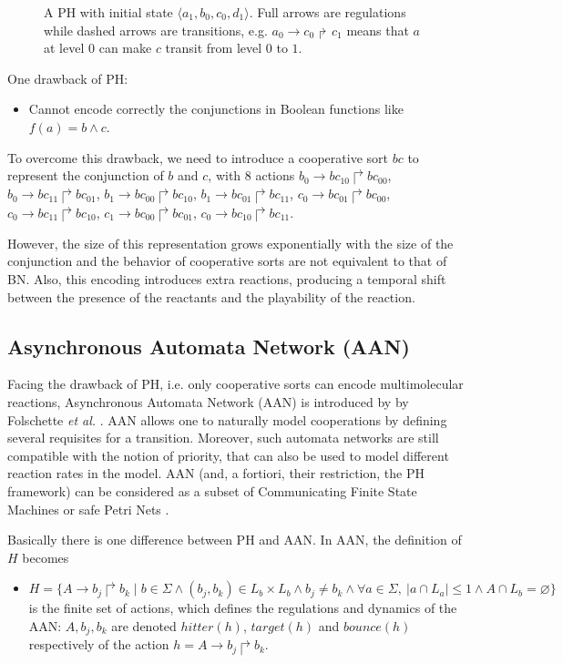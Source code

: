 \begin{figure}[ht]
\centering

\caption[Process Hitting]{A PH with initial state $\langle a_1,b_0,c_0,d_1\rangle$.
Full arrows are regulations while dashed arrows are transitions, e.g. $a_0\to c_0\Rsh c_1$  means that $a$ at level $0$ can make $c$ transit from level $0$ to $1$.}\label{fig:PH}
\end{figure}

One drawback of PH: 

\begin{itemize}
    \item Cannot encode correctly the conjunctions in Boolean functions like $f(a)=b\land c$.
\end{itemize}

To overcome this drawback, we need to introduce a cooperative sort $bc$ to represent the conjunction of $b$ and $c$, with 8 actions $b_0\to bc_{10}\Rsh bc_{00}$, $b_0\to bc_{11}\Rsh bc_{01}$, $b_1\to bc_{00}\Rsh bc_{10}$, $b_1\to bc_{01}\Rsh bc_{11}$, $c_0\to bc_{01}\Rsh bc_{00}$, $c_0\to bc_{11}\Rsh bc_{10}$, $c_1\to bc_{00}\Rsh bc_{01}$, $c_0\to bc_{10}\Rsh bc_{11}$.

However, the size of this representation grows exponentially with the size of the conjunction and the behavior of cooperative sorts are not equivalent to that of BN. 
Also, this encoding introduces extra reactions, producing a temporal shift between the presence of the reactants and the playability of the reaction.

\subsection{Asynchronous Automata Network (AAN)}
Facing the drawback of PH, i.e. only cooperative sorts can encode multimolecular reactions, Asynchronous Automata Network (AAN) is introduced by by Folschette \textit{et al.} \cite{folschette2015}.
AAN allows one to naturally model cooperations by defining several requisites for a transition.
Moreover, such automata networks are still compatible with the notion of priority, that can also be used to model different reaction rates in the model.
AAN (and, a fortiori, their restriction, the PH framework) can be considered as a subset of Communicating Finite State Machines or safe Petri Nets \cite{pauleve2012process}.

Basically there is one difference between PH and AAN. 
In AAN, the definition of $H$ becomes

\begin{itemize}
    \item $H=\{A\to b_j\Rsh b_k\mid b\in \Sigma \land (b_j,b_k)\in L_b\times L_b\land b_j\neq b_k\land \forall a \in \Sigma,\ |a\cap L_a|\leq 1 \land A\cap L_b=\varnothing\}$ is the finite set of actions, which defines the regulations and dynamics of the AAN: $A, b_j, b_k$ are denoted $hitter(h)$, $target(h)$ and $bounce(h)$ respectively of the action $h=A\to b_j\Rsh b_k$.
\end{itemize}

